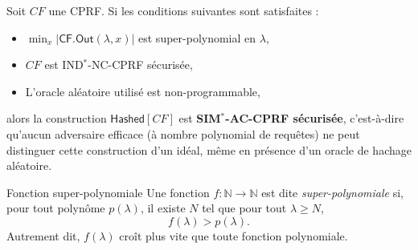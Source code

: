 \documentclass[9pt]{extarticle}
\begin{document}
\begin{defbox}{}
Soit $CF$ une CPRF. Si les conditions suivantes sont satisfaites :
\begin{itemize}
    \item $\min_x |\textsf{CF.Out}(\lambda, x)|$ est super-polynomial en $\lambda$,
    \item $CF$ est IND$^*$-NC-CPRF sécurisée,
    \item L'oracle aléatoire utilisé est non-programmable,
\end{itemize}
alors la construction $\textsf{Hashed}[CF]$ est \textbf{SIM$^*$-AC-CPRF sécurisée},
c’est-à-dire qu’aucun adversaire efficace (à nombre polynomial de requêtes)
ne peut distinguer cette construction d’un idéal, même en présence d’un oracle de hachage aléatoire.
\end{defbox}

\begin{defbox}{Fonction super-polynomiale}
Une fonction $f : \mathbb{N} \rightarrow \mathbb{N}$ est dite \emph{super-polynomiale} si, pour tout polynôme $p(\lambda)$, il existe $N$ tel que pour tout $\lambda \geq N$,
\[
f(\lambda) > p(\lambda).
\]
Autrement dit, $f(\lambda)$ croît plus vite que toute fonction polynomiale.
\end{defbox}
\end{document}
